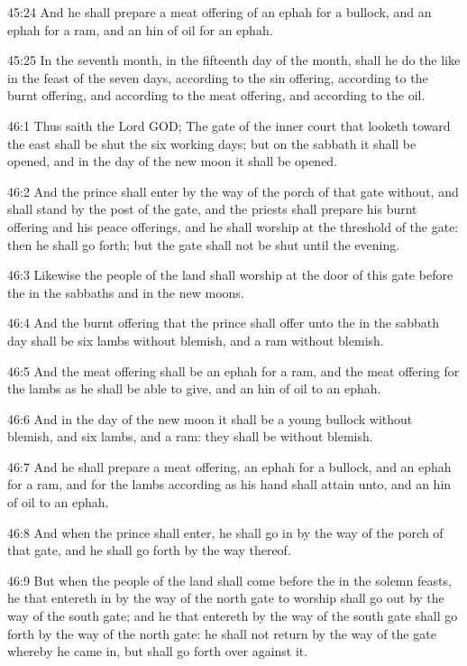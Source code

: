 45:24 And he shall prepare a meat offering of an ephah for a bullock, and an ephah for a ram, and an hin of oil for an ephah.

45:25 In the seventh month, in the fifteenth day of the month, shall he do the like in the feast of the seven days, according to the sin offering, according to the burnt offering, and according to the meat offering, and according to the oil.

46:1 Thus saith the Lord GOD; The gate of the inner court that looketh toward the east shall be shut the six working days; but on the sabbath it shall be opened, and in the day of the new moon it shall be opened.

46:2 And the prince shall enter by the way of the porch of that gate without, and shall stand by the post of the gate, and the priests shall prepare his burnt offering and his peace offerings, and he shall worship at the threshold of the gate: then he shall go forth; but the gate shall not be shut until the evening.

46:3 Likewise the people of the land shall worship at the door of this gate before the \LORD in the sabbaths and in the new moons.

46:4 And the burnt offering that the prince shall offer unto the \LORD in the sabbath day shall be six lambs without blemish, and a ram without blemish.

46:5 And the meat offering shall be an ephah for a ram, and the meat offering for the lambs as he shall be able to give, and an hin of oil to an ephah.

46:6 And in the day of the new moon it shall be a young bullock without blemish, and six lambs, and a ram: they shall be without blemish.

46:7 And he shall prepare a meat offering, an ephah for a bullock, and an ephah for a ram, and for the lambs according as his hand shall attain unto, and an hin of oil to an ephah.

46:8 And when the prince shall enter, he shall go in by the way of the porch of that gate, and he shall go forth by the way thereof.

46:9 But when the people of the land shall come before the \LORD in the solemn feasts, he that entereth in by the way of the north gate to worship shall go out by the way of the south gate; and he that entereth by the way of the south gate shall go forth by the way of the north gate: he shall not return by the way of the gate whereby he came in, but shall go forth over against it.

